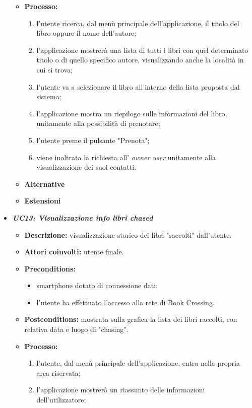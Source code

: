 \begin{itemize}
\begin{itemize}
\begin{itemize}
		\end{itemize}
		\item \textbf{Processo:}
		\begin{enumerate}
			\item l'utente ricerca, dal menù principale dell'applicazione, il titolo del libro oppure il nome dell'autore;
			\item l'applicazione mostrerà una lista di tutti i libri con quel determinato titolo o di quello specifico autore, visualizzando anche la località in cui si trova;
			\item l'utente va a selezionare il libro all'interno della lista proposta dal sistema;
			\item l'applicazione mostra un riepilogo sulle informazioni del libro, unitamente alla possibilità di prenotare;
			\item l'utente preme il pulsante "Prenota";
			\item viene inoltrata la richiesta all' \textit{owner user} unitamente alla visualizzazione dei suoi contatti.
		\end{enumerate}
		\item \textbf{Alternative}
		\item \textbf{Estensioni}
	\end{itemize}
	\item \textbf{\textit{UC13: Visualizzazione info libri chased}}
	\begin{itemize}
		\item \textbf{Descrizione:} visualizzazione storico dei libri "raccolti" dall'utente.
		\item \textbf{Attori coinvolti:} utente finale.
		\item \textbf{Preconditions:}
		\begin{itemize}
			\item smartphone dotato di connessione dati;
			\item l’utente ha effettuato l’accesso alla rete di Book Crossing.
		\end{itemize}
		\item \textbf{Postconditions:} mostrata sulla grafica la lista dei libri raccolti, con relativa data e luogo di "chasing".
		\item \textbf{Processo:}
		\begin{enumerate}
			\item l'utente, dal menù principale dell'applicazione, entra nella propria area riservata;
			\item l'applicazione mostrerà un riassunto delle informazioni dell'utilizzatore;

\end{enumerate}
\end{itemize}
\end{itemize}
